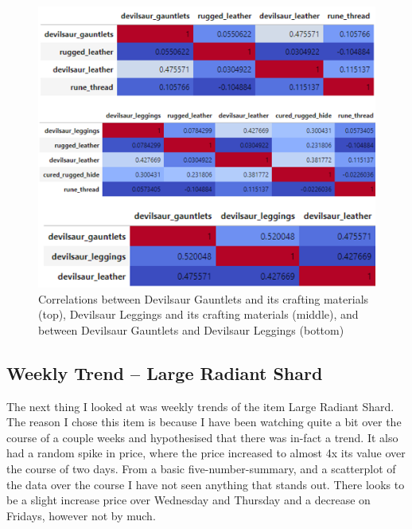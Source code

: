 \documentclass[sigconf]{acmart}
\begin{document}
\begin{figure}[h]
  \centering
  \includegraphics[width=\linewidth]{Devilsaur_Correlations}
  \caption{Correlations between Devilsaur Gauntlets and its crafting materials (top), Devilsaur Leggings and its crafting materials (middle), and between Devilsaur Gauntlets and Devilsaur Leggings (bottom)}
\end{figure}

\subsection{Weekly Trend – Large Radiant Shard}

The next thing I looked at was weekly trends of the item Large Radiant Shard. The reason I chose this item is because I have been watching quite a bit over the course of a couple weeks and hypothesised that there was in-fact a trend. It also had a random spike in price, where the price increased to almost 4x its value over the course of two days. From a basic five-number-summary, and a scatterplot of the data over the course I have not seen anything that stands out. There looks to be a slight increase price over Wednesday and Thursday and a decrease on Fridays, however not by much.
\end{document}

